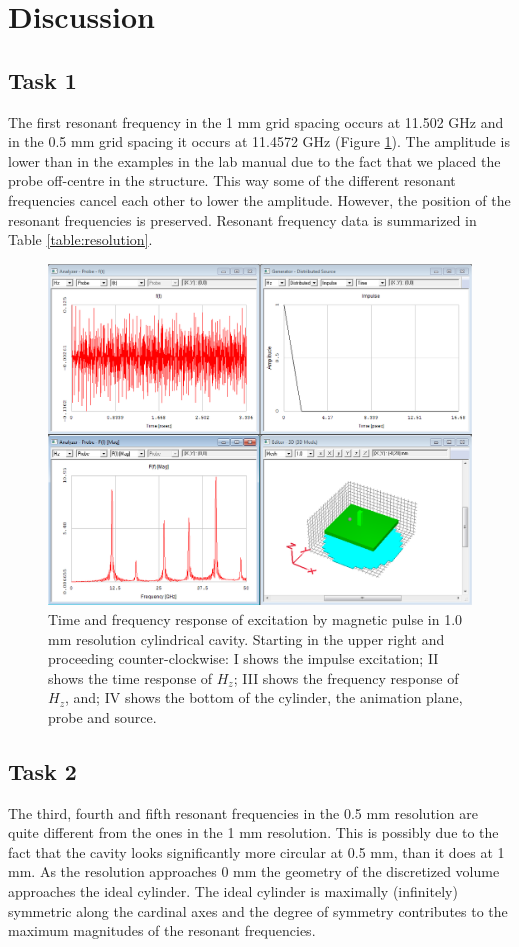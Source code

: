 \section{Discussion}\label{sec:discussion}
\subsection{Task 1}
The first resonant frequency in the 1 mm grid spacing occurs at 11.502 GHz and in the 0.5 mm grid spacing it occurs at 11.4572 GHz (Figure \ref{fig:freqresponse1mm}). The amplitude is lower than in the examples in the lab manual due to the fact that we placed the probe off-centre in the structure. This way some of the different resonant frequencies cancel each other to lower the amplitude. However, the position of the resonant frequencies is preserved. Resonant frequency data is summarized in Table \ref{table:resolution}.

\begin{figure}[tbph]
\centering
\includegraphics[width=0.95\linewidth]{"graphics/freq response 1mm"}
\caption{Time and frequency response of excitation by magnetic pulse in 1.0 mm resolution cylindrical cavity. Starting in the upper right and proceeding counter-clockwise: I shows the impulse excitation; II shows the time response of $H_z$; III shows the frequency response of $H_z$, and; IV shows the bottom of the cylinder, the animation plane, probe and source.}
\label{fig:freqresponse1mm}
\end{figure}

\subsection{Task 2}
The third, fourth and fifth resonant frequencies in the 0.5 mm resolution are quite different from the ones in the 1 mm resolution. This is possibly due to the fact that the cavity looks significantly more circular at 0.5 mm, than it does at 1 mm. As the resolution approaches 0 mm the geometry of the discretized volume approaches the ideal cylinder. The ideal cylinder is maximally (infinitely) symmetric along the cardinal axes and the degree of symmetry contributes to the maximum magnitudes of the resonant frequencies.

